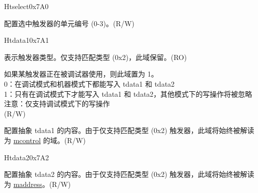 \begin{register}{H}{tselect}{0x7A0}\label{regdesc:TSELECT}
%
%
\regnewline%
\begin{regdesc}\begin{reglist}
\label{fielddesc:TSELECT}\item [tselect] 配置选中触发器的单元编号 (0-3)。(R/W)
\end{reglist}\end{regdesc}
\end{register}

\begin{register}{H}{tdata1}{0x7A1}\label{regdesc:TDATA1}
%
%
%
\regnewline%
\begin{regdesc}\begin{reglist}
\label{fielddesc:TDATA1TYPE}\item [type] 表示触发器类型。仅支持匹配类型 (0x2)，此域保留。(RO)
\label{fielddesc:TDATA1DMODE}\item [dmode] 如果某触发器正在被调试器使用，则此域置为 1。\\
0：在调试模式和机器模式下都能写入 tdata1 和 tdata2\\
1：只有在调试模式下才能写入 tdata1 和 tdata2，其他模式下的写操作将被忽略\\
注意：仅支持调试模式下的写操作\\
(R/W)
\label{fielddesc:TDATA1DATA}\item [data] 配置抽象 tdata1 的内容。由于仅支持匹配类型 (0x2) 触发器，此域将始终被解读为 \hyperref[regdesc:MCONTROL]{mcontrol} 的域。(R/W)
\end{reglist}\end{regdesc}
\end{register}

\begin{register}{H}{tdata2}{0x7A2}\label{regdesc:TDATA2}
%
\regnewline%
\begin{regdesc}\begin{reglist}
\label{fielddesc:TDATA2}\item [tdata2] 配置抽象 tdata2 的内容。由于仅支持匹配类型 (0x2) 触发器，此域将始终被解读为 \hyperref[regdesc:MADDRESS]{maddress}。(R/W)
\end{reglist}\end{regdesc}
\end{register}

